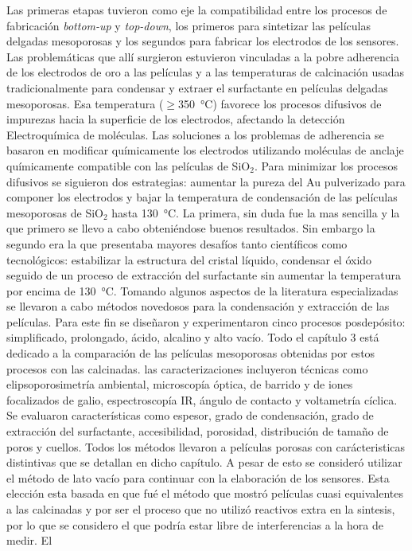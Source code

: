 Las primeras etapas tuvieron como eje la compatibilidad entre los procesos de fabricación \textit{bottom-up} y \textit{top-down}, los primeros para sintetizar las películas delgadas mesoporosas y los segundos para fabricar los electrodos de los sensores. Las problemáticas que allí surgieron estuvieron vinculadas a la pobre adherencia de los electrodos de oro a las películas y a las temperaturas de calcinación usadas tradicionalmente para condensar y extraer el surfactante en películas delgadas mesoporosas. Esa temperatura ($\geq$\SI{350}{\celsius}) favorece los procesos difusivos de impurezas hacia la superficie de los electrodos, afectando la detección Electroquímica de moléculas. Las soluciones a los problemas de adherencia se basaron en modificar químicamente los electrodos utilizando moléculas de anclaje químicamente compatible con las películas de SiO$_2$. Para minimizar los procesos difusivos se siguieron dos estrategias: aumentar la pureza del Au pulverizado para componer los electrodos y bajar la temperatura de condensación de las películas mesoporosas de SiO$_2$ hasta \SI{130}{\celsius}. La primera, sin duda fue la mas sencilla y la que primero se llevo a cabo obteniéndose buenos resultados. Sin embargo la segundo era la que presentaba mayores desafíos tanto científicos como tecnológicos: estabilizar la estructura del cristal líquido, condensar el óxido seguido de un proceso de extracción del surfactante sin aumentar la temperatura por encima de \SI{130}{\celsius}. Tomando algunos aspectos de la literatura especializadas se llevaron a cabo métodos novedosos para la condensación y extracción de las películas. Para este fin se diseñaron y experimentaron cinco procesos posdepósito: simplificado, prolongado, ácido, alcalino y alto vacío. Todo el capítulo 3 está dedicado a la comparación de las películas mesoporosas obtenidas por estos procesos con las calcinadas. las caracterizaciones incluyeron técnicas como elipsoporosimetría ambiental, microscopía óptica, de barrido y de iones focalizados de galio, espectroscopía IR, ángulo de contacto y voltametría cíclica. Se evaluaron características como espesor, grado de condensación, grado de extracción del surfactante, accesibilidad, porosidad, distribución de tamaño de poros y cuellos. Todos los métodos llevaron a películas porosas con carácteristicas distintivas que se detallan en dicho capítulo. A pesar de esto se consideró utilizar el método de lato vacío para continuar con la elaboración de los sensores. Esta elección esta basada en que fué el método que mostró películas cuasi equivalentes a las calcinadas y por ser el proceso que no utilizó reactivos extra en la sintesis, por lo que se considero el que podría estar libre de interferencias a la hora de medir. El 